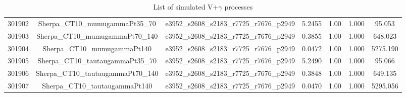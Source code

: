 \begin{table}[htbp]
\begin{center}
{\begin{tabular}{ccccccc}
301902 & Sherpa\_CT10\_mumugammaPt35\_70 & e3952\_s2608\_s2183\_r7725\_r7676\_p2949 & 5.2455 & 1.00 & 1.000 & 95.053 \\ 
301903 & Sherpa\_CT10\_mumugammaPt70\_140 & e3952\_s2608\_s2183\_r7725\_r7676\_p2949 & 0.3855 & 1.00 & 1.000 & 648.023 \\ 
301904 & Sherpa\_CT10\_mumugammaPt140 & e3952\_s2608\_s2183\_r7725\_r7676\_p2949 & 0.0472 & 1.00 & 1.000 & 5275.190 \\ 
301905 & Sherpa\_CT10\_tautaugammaPt35\_70 & e3952\_s2608\_s2183\_r7725\_r7676\_p2949 & 5.2490 & 1.00 & 1.000 & 95.066 \\ 
301906 & Sherpa\_CT10\_tautaugammaPt70\_140 & e3952\_s2608\_s2183\_r7725\_r7676\_p2949 & 0.3848 & 1.00 & 1.000 & 649.135 \\ 
301907 & Sherpa\_CT10\_tautaugammaPt140 & e3952\_s2608\_s2183\_r7725\_r7676\_p2949 & 0.0470 & 1.00 & 1.000 & 5295.056 \\ 
\hline
\end{tabular}}
\end{center}
\caption{List of simulated V+$\gamma$ processes}
\label{table:vgamma}
\end{table} 
